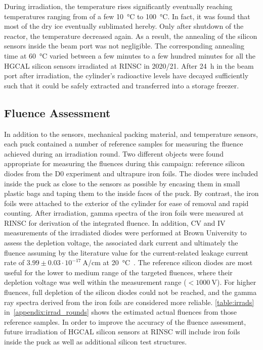 During irradiation, the temperature rises significantly eventually reaching temperatures ranging from of a few \SI{10}{\celsius} to \SI{100}{\celsius}.
In fact, it was found that most of the dry ice eventually sublimated hereby.
Only after shutdown of the reactor, the temperature decreased again.
As a result, the annealing of the silicon sensors inside the beam port was not negligible.
The corresponding annealing time at \SI{60}{\celsius} varied between a few minutes to a few hundred minutes for all the HGCAL silicon sensors irradiated at RINSC in 2020/21.
After \SI{24}{\hour} in the beam port after irradiation, the cylinder's radioactive levels have decayed sufficiently such that it could be safely extracted and transferred into a storage freezer.

\subsection{Fluence Assessment}
In addition to the sensors, mechanical packing material, and temperature sensors, each puck contained a number of reference samples for measuring the fluence achieved during an irradiation round. 
Two different objects were found appropriate for measuring the fluences during this campaign: reference silicon diodes from the D0 experiment and ultrapure iron foils. 
The diodes were included inside the puck as close to the sensors as possible by encasing them in small plastic bags and taping them to the inside faces of the puck. 
By contrast, the iron foils were attached to the exterior of the cylinder for ease of removal and rapid counting. 
After irradiation, gamma spectra of the iron foils were measured at RINSC for derivation of the integrated fluence.
In addition, CV and IV measurements of the irradiated diodes were performed at Brown University to assess the depletion voltage, the associated dark current and ultimately the fluence assuming by the literature value for the current-related leakage current rate of $3.99\pm 0.03\cdot 10^{-17}~$A/cm at \SI{20}{\celsius}~\cite{moll:SiDamages}.
The reference silicon diodes are most useful for the lower to medium range of the targeted fluences,  where their depletion voltage was well within the measurement range ($<\SI{1000}{\volt}$).
For higher fluences, full depletion of the silicon diodes could not be reached, and the gamma ray spectra derived from the iron foils are considered more reliable.
\ref{table:irrads} in~\ref{appendix:irrad_rounds} shows the estimated actual fluences from those reference samples.
In order to improve the accuracy of the fluence assessment, future irradiation of HGCAL silicon sensors at RINSC will include iron foils inside the puck as well as additional silicon test structures.